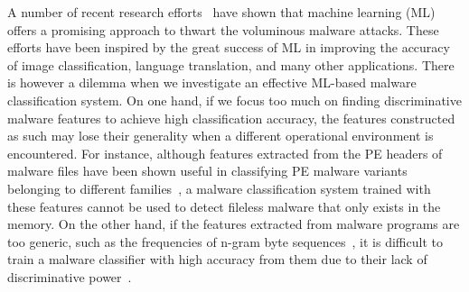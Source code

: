 A number of recent research efforts~\cite{NgramMalwareDetect, QgramMalwareDetect, McBoost, GraphMalwareDetect, YanDataset, AutoEncoderFeatureLearn, AutoEncoderMicrosoft, FunctionCallGraph, YuxinMalwareDnn,NovelFeatureFusion,StaticFeatures,PolySeqCls} have shown that machine learning (ML) offers a promising approach to thwart the voluminous malware attacks.
These efforts have been inspired by the great success of ML in improving the accuracy of image classification, language translation, and many other applications.
There is however a dilemma when we investigate an effective ML-based malware classification system.
On one hand, if we focus too much on finding discriminative malware features to achieve high classification accuracy, the features constructed as such may lose their generality when a different operational environment is encountered.
For instance, although features extracted from the PE headers of malware files have been shown useful in classifying PE malware variants belonging to different families~\cite{yan2013exploring},
a malware classification system trained with these features cannot be used to detect fileless malware that only exists in the memory.
On the other hand, if the features extracted from malware programs are too generic, such as the frequencies of n-gram byte sequences~\cite{NgramMalwareDetect},
it is difficult to train a malware classifier with high accuracy from them due to their lack of discriminative power~\cite{yan2013exploring}.

